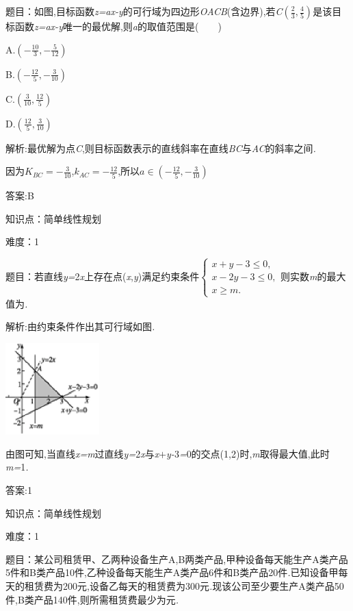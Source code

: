 \documentclass{article} %
\begin{document}
 题目：如图,目标函数\textit{z=ax-y}的可行域为四边形\textit{OACB}(含边界),若\textit{C}$(\frac{2}{3},\frac{4}{5})$是该目标函数\textit{z=ax-y}唯一的最优解,则\textit{a}的取值范围是(\textit{　　})

 

 A.$(-\frac{10}{3},-\frac{5}{12})$

 B.$(-\frac{12}{5},-\frac{3}{10})$

 C.$(\frac{3}{10},\frac{12}{5})$

 D.$(\frac{12}{5},\frac{3}{10})$

 解析:最优解为点\textit{C},则目标函数表示的直线斜率在直线\textit{BC}与\textit{AC}的斜率之间\textit{.}

因为$K_{BC}=-\frac{3}{10}$,$k_{AC}=-\frac{12}{5}$,所以$a \in (-\frac{12}{5},-\frac{3}{10})$

 答案:B

知识点：简单线性规划

难度：1

 题目：若直线\textit{y=}2\textit{x}上存在点(\textit{x},\textit{y})满足约束条件$
\begin{cases}
x+y-3 \le 0,\\
x-2y-3\le 0,\\
x \ge m.
\end{cases}$则实数\textit{m}的最大值为\textit{\underbar{　　　　　}.~}

 解析:由约束条件作出其可行域如图\textit{.}

 \includegraphics*[width=1.43in, height=1.39in, keepaspectratio=false]{image1711}

由图可知,当直线\textit{x=m}过直线\textit{y=}2\textit{x}与\textit{x$+$y-}3\textit{=}0的交点(1,2)时,\textit{m}取得最大值,此时\textit{m=}1\textit{.}

 答案:1

知识点：简单线性规划

难度：1

题目：某公司租赁甲、乙两种设备生产A,B两类产品,甲种设备每天能生产A类产品5件和B类产品10件,乙种设备每天能生产A类产品6件和B类产品20件\textit{.}已知设备甲每天的租赁费为200元,设备乙每天的租赁费为300元\textit{.}现该公司至少要生产A类产品50件,B类产品140件,则所需租赁费最少为\textit{\underbar{　　　　　}}元\textit{.~}
\end{document}
